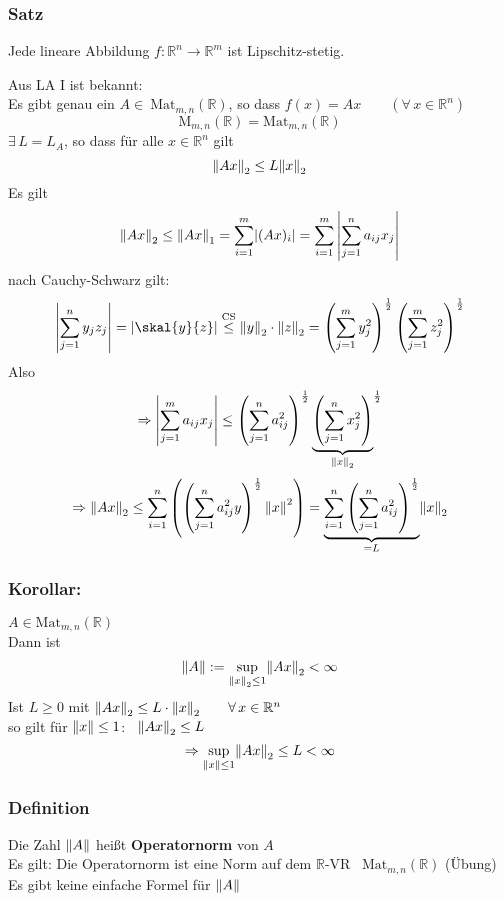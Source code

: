 \subsubsection{Satz} %
\label{ssub:satz}
Jede lineare Abbildung $f:\mathbb{R}^n \to \mathbb{R}^m$ ist Lipschitz-stetig.

 Aus LA I ist bekannt: \\
Es gibt genau ein $A \in \ \text{Mat}_{m,n}(\mathbb{R})$, so dass $f(x)=Ax \qquad (\forall\, x \in \mathbb{R}^n)$ 
\[
	\text{M}_{m,n}(\mathbb{R}) = \text{Mat}_{m,n}(\mathbb{R})
\]
$\exists \, L=L_A$, so dass für alle $x \in \mathbb{R}^n$ gilt 
\[
	\norm{Ax}_2 \leq L \norm{x}_2
\]
Es gilt 
\[
	\norm{Ax}_2 \leq \norm{Ax}_1 = \sum^{m}_{i=1} \abs{(Ax)_i} = \sum^{m}_{i=1} \left|\sum^{n}_{j=1} a_{ij}x_j \right| 
\]
nach Cauchy-Schwarz gilt:
\[
	\left| \sum^{n}_{j=1}y_jz_j \right | =\abs{\skal{y}{z}} \stackrel{\text{CS}}{\leq } \norm{y}_2 \cdot \norm{z}_2 = \left( \sum^{m}_{j=1}y_j^2 \right)^{\frac{1}{2}}
	 \left( \sum^{m}_{j=1}z_j^2 \right)^{\frac{1}{2}}
\]
Also 
\[
	\Rightarrow \left| \sum^{m}_{j=1}a_{ij}x_j \right| \leq \left( \sum^{n}_{j=1}a_{ij}^2 \right)^{\frac{1}{2}} \underset{\norm{x}_2}{\underbrace{
	\left ( \sum^{n}_{j=1}x_{j}^2 \right ) }}^{\frac{1}{2}}
\]
\[
	\Rightarrow \norm{Ax}_2 \leq \sum^{n}_{i=1} \left( \left( \sum^{n}_{j=1}a_{ij}^2y \right)^{\frac{1}{2}}\norm{x}^2 \right) = \underset{=L}{\underbrace{\sum^{n}_{i=1} \left( \sum^{n}_{j=1}a_{ij}^2 \right)^{\frac{1}{2}}}} \norm{x}_2
\] 
\bewende
\subsubsection{Korollar:} %
\label{ssub:korollar}
$A \in \text{Mat}_{m,n}(\mathbb{R})$ \\
Dann ist 
\[
	\norm{A}:= \sup\limits_{\norm{x}_2 \leq 1} \norm{Ax}_2 < \infty
\]
Ist $L \geq 0$ mit $\norm{Ax}_2 \leq L \cdot \norm{x}_2 \qquad \forall\, x \in \mathbb{R}^n$ \\ 
so gilt für $\norm{x}\leq 1$: \, $\norm{Ax}_2 \leq L$
\[
	\Rightarrow \sup\limits_{\norm{x}\leq 1}\norm{Ax}_2 \leq L < \infty
\]
 \bewende
\subsubsection{Definition} %
\label{ssub:definition}
Die Zahl $\norm{A}$ heißt {\bfseries Operatornorm} von $A$ \\
Es gilt: Die Operatornorm ist eine Norm auf dem $\mathbb{R}$-VR \, $\text{Mat}_{m,n}(\mathbb{R})$ \qquad (Übung) \\
Es gibt keine einfache Formel für $\norm{A}$
